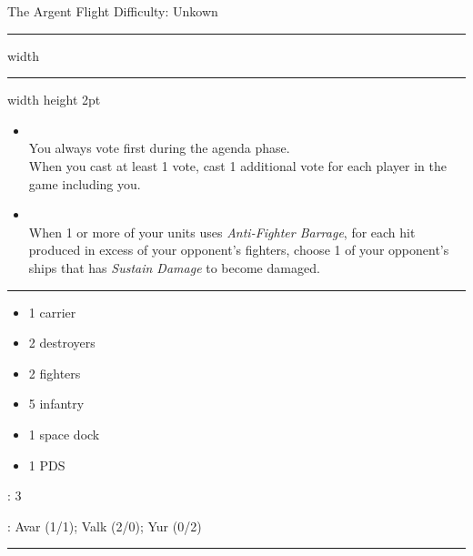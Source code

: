 {\handel \Huge The Argent Flight} \hfill {\Large Difficulty: Unkown} \vspace{-4pt}\\
\hrule width \hsize \kern 1mm \hrule width \hsize height 2pt


\begin{multicols}{2}


\begin{itemize}
\item {}\\
You always vote first during the agenda phase.\\
When you cast at least 1 vote, cast 1 additional vote for each player in the game including you.
\item {}\\
When 1 or more of your units uses \emph{Anti-Fighter Barrage}, for each hit produced in excess of your opponent's fighters, choose 1 of your opponent's ships that has \emph{Sustain Damage} to become damaged.
\end{itemize}


\vspace{-10pt}\rule{\hsize}{0.4pt}\vspace{5pt}



\vspace{-5pt}
\begin{multicols}{2}
\begin{itemize}
\item 1 carrier
\item 2 destroyers
\item 2 fighters
\item 5 infantry
\item 1 space dock
\item 1 PDS
\end{itemize}
\end{multicols}

\vspace{-5pt}
: 3

\vspace{2pt}
: Avar (1/1); Valk (2/0); Yur (0/2)

\rule{\hsize}{0.4pt}\vspace{5pt}



\end{multicols}
